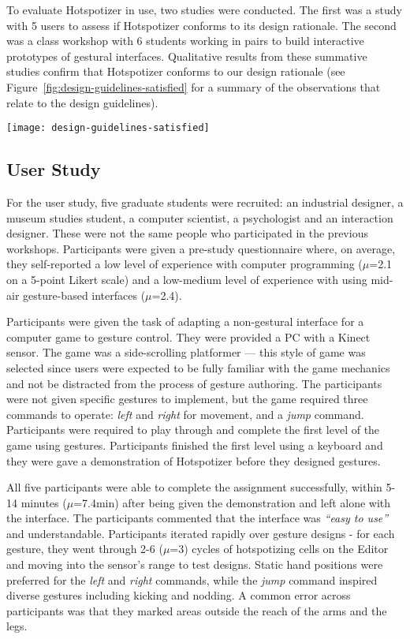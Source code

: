 To evaluate Hotspotizer in use, two studies were conducted. The first was a study with 5 users to assess if Hotspotizer conforms to its design rationale. The second was a class workshop with 6 students working in pairs to build interactive prototypes of gestural interfaces. Qualitative results from these summative studies confirm that Hotspotizer conforms to our design rationale (see Figure~\ref{fig:design-guidelines-satisfied} for a summary of the observations that relate to the design guidelines).

\begin{SCfigure}[\sidecaptionrelwidth][ht]
\centering
\texttt{[image: design-guidelines-satisfied]}
\caption{Qualitative findings from two studies affirm that Hotspotizer is in keeping with our design rationale.}
\label{fig:design-guidelines-satisfied}
\end{SCfigure}

\subsection{User Study}

For the user study, five graduate students were recruited: an industrial designer, a museum studies student, a computer scientist, a psychologist and an interaction designer. These were not the same people who participated in the previous workshops. Participants were given a pre-study questionnaire where, on average, they self-reported a low level of experience with computer programming ($\mu$=2.1 on a 5-point Likert scale) and a low-medium level of experience with using mid-air gesture-based interfaces ($\mu$=2.4).

Participants were given the task of adapting a non-gestural interface for a computer game to gesture control. They were provided a PC with a Kinect sensor. The game was a side-scrolling platformer --- this style of game was selected since users were expected to be fully familiar with the game mechanics and not be distracted from the process of gesture authoring. The participants were not given specific gestures to implement, but the game required three commands to operate: \emph{left} and \emph{right} for movement, and a \emph{jump} command. Participants were required to play through and complete the first level of the game using gestures. Participants finished the first level using a keyboard and they were gave a demonstration of Hotspotizer before they designed gestures.

All five participants were able to complete the assignment successfully, within 5-14 minutes ($\mu$=7.4min) after being given the demonstration and left alone with the interface. The participants commented that the interface was \emph{“easy to use”} and understandable. Participants iterated rapidly over gesture designs - for each gesture, they went through 2-6 ($\mu$=3) cycles of hotspotizing cells on the Editor and moving into the sensor’s range to test designs. Static hand positions were preferred for the \emph{left} and \emph{right} commands, while the \emph{jump} command inspired diverse gestures including kicking and nodding. A common error across participants was that they marked areas outside the reach of the arms and the legs.

